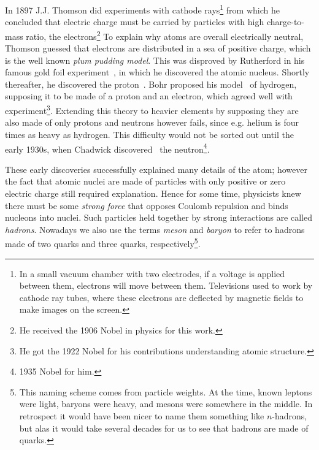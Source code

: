 In 1897 J.J. Thomson did experiments with cathode rays\footnote{In a small
vacuum chamber with two electrodes, if a voltage is applied between them,
electrons will move between them. Televisions used to work by cathode ray tubes,
 where these electrons are deflected by magnetic fields
to make images on the screen.}
from which he concluded that electric charge must be carried by particles
with high charge-to-mass ratio, the electrons\footnote{He received the 1906
Nobel in physics for this work.} 
To explain why atoms are overall electrically neutral, Thomson guessed that
electrons are distributed in a sea of positive charge, which is the
well known {\it plum pudding model}. This was
disproved by Rutherford in his famous gold foil
experiment~\cite{rutherford_scattering_1911}, in which he discovered
the atomic nucleus. Shortly thereafter, he discovered the
proton~\cite{rutherford_collision_1919}.
Bohr proposed his model~\cite{bohr_constitution_1913}
of hydrogen, supposing it to be made of a proton and an electron, which agreed
well with experiment\footnote{He got the 1922 Nobel for his
contributions understanding atomic structure.}. Extending this theory to 
heavier elements by supposing
they are also made of only protons and neutrons however fails, since e.g. helium
is four times as heavy as hydrogen. This difficulty would not be sorted out
until the early 1930s, when Chadwick discovered~\cite{chadwick_possible_1932}
the neutron\footnote{1935 Nobel for him.}.


These early discoveries successfully explained many details of the atom; however
the fact that atomic nuclei are made of particles with only positive or zero
electric charge still required explanation.
Hence for some time, physicists
knew there must be some {\it strong force} that opposes
Coulomb repulsion and binds nucleons into nuclei.
Such particles held together by strong interactions are called
{\it hadrons}. Nowadays we also use the terms {\it meson}
 and {\it baryon} to refer to hadrons made of
two quarks and three quarks, respectively\footnote{This naming scheme
comes from particle weights. At the time, known leptons were light, 
baryons were heavy, and mesons were somewhere in the middle. In retrospect it
would have been nicer to name them something like $n$-hadrons, but alas it would
take several decades for us to see that hadrons are made of quarks.}.


